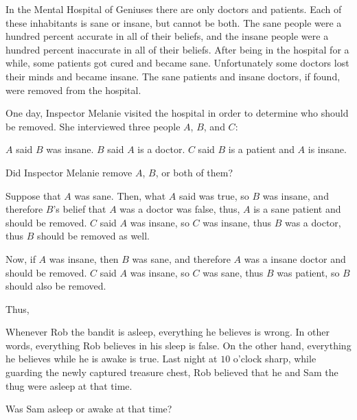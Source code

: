 \documentclass{article}
\begin{document}
\begin{example*}
    \label{example:pi-2022-4-p11}
    In the Mental Hospital of Geniuses there are only doctors and patients.
    Each of these inhabitants is sane or insane, but cannot be both.
    The sane people were a hundred percent accurate in all of their beliefs, 
    and the insane people were a hundred percent inaccurate in all of their beliefs.
    After being in the hospital for a while, some patients got cured and became sane.
    Unfortunately some doctors lost their minds and became insane.
    The sane patients and insane doctors, if found, were removed from the hospital.
    
    One day, Inspector Melanie visited the hospital in order to determine who should be removed.
    She interviewed three people $A$, $B$, and $C$:
    \begin{itemize}[topsep=0pt, partopsep=0pt, itemsep=0pt]
        \ii $A$ said $B$ was insane.
        \ii $B$ said $A$ is a doctor.
        \ii $C$ said $B$ is a patient and $A$ is insane.
    \end{itemize}

    Did Inspector Melanie remove $A$, $B$, or both of them?
\end{example*}

\begin{soln} 
    Suppose that $A$ was sane. Then, what $A$ said was true, so $B$ was insane, and therefore $B$'s belief that $A$ was a doctor
    was false, thus, $A$ is a sane patient and should be removed.
    $C$ said $A$ was insane, so $C$ was insane, thus $B$ was a doctor, thus $B$ should be removed as well.
    
    Now, if $A$ was insane, then $B$ was sane, and therefore $A$ was a insane doctor and should be removed.
    $C$ said $A$ was insane, so $C$ was sane, thus $B$ was patient, so $B$ should also be removed.
    
    Thus, 
\end{soln}

\bigbreak

\begin{exercise*}
    \label{exercise:pi-2022-4-p12}
    Whenever Rob the bandit is asleep, everything he believes is wrong.
    In other words, everything Rob believes in his sleep is false.
    On the other hand, everything he believes while he is awake is true.
    Last night at $10$ o'clock sharp,
    while guarding the newly captured treasure chest,
    Rob believed that he and Sam the thug were asleep at that time.
    
    Was Sam asleep or awake at that time?
\end{exercise*}
\end{document}
